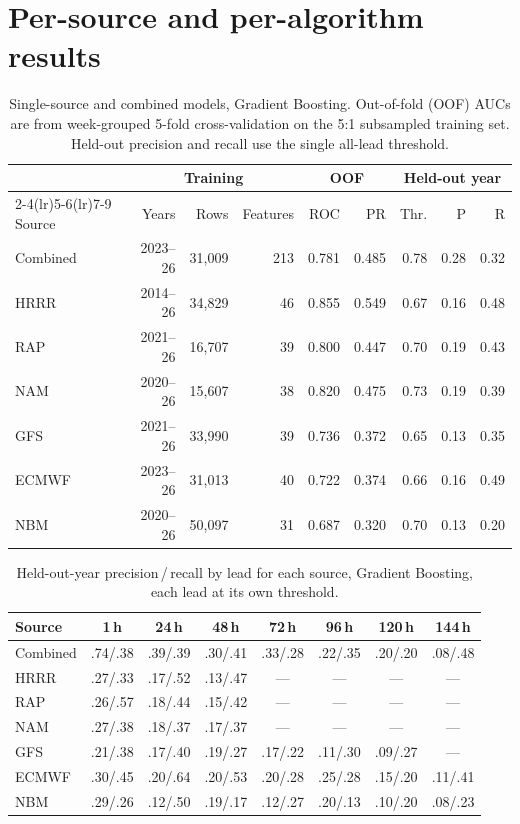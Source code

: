 \documentclass[11pt]{article}
\begin{document}
\section{Per-source and per-algorithm results}\label{app:sources}
\begin{table}[ht]\centering\small
\caption{Single-source and combined models, Gradient Boosting. Out-of-fold (OOF) AUCs are from
week-grouped 5-fold cross-validation on the 5:1 subsampled training set. Held-out precision and
recall use the single all-lead threshold.}\label{tab:persource}
\begin{tabular}{l r r r r r r r r}
\toprule
& \multicolumn{3}{c}{Training} & \multicolumn{2}{c}{OOF} & \multicolumn{3}{c}{Held-out year}\\
\cmidrule(lr){2-4}\cmidrule(lr){5-6}\cmidrule(lr){7-9}
Source & Years & Rows & Features & ROC & PR & Thr. & P & R\\
\midrule
Combined & 2023--26 & 31{,}009 & 213 & 0.781 & 0.485 & 0.78 & 0.28 & 0.32\\
HRRR  & 2014--26 & 34{,}829 & 46 & 0.855 & 0.549 & 0.67 & 0.16 & 0.48\\
RAP   & 2021--26 & 16{,}707 & 39 & 0.800 & 0.447 & 0.70 & 0.19 & 0.43\\
NAM   & 2020--26 & 15{,}607 & 38 & 0.820 & 0.475 & 0.73 & 0.19 & 0.39\\
GFS   & 2021--26 & 33{,}990 & 39 & 0.736 & 0.372 & 0.65 & 0.13 & 0.35\\
ECMWF & 2023--26 & 31{,}013 & 40 & 0.722 & 0.374 & 0.66 & 0.16 & 0.49\\
NBM   & 2020--26 & 50{,}097 & 31 & 0.687 & 0.320 & 0.70 & 0.13 & 0.20\\
\bottomrule
\end{tabular}
\end{table}

\begin{table}[ht]\centering\small
\caption{Held-out-year precision\,/\,recall by lead for each source, Gradient Boosting, each lead at
its own threshold.}\label{tab:prlead}
\begin{tabular}{l c c c c c c c}
\toprule
Source & 1\,h & 24\,h & 48\,h & 72\,h & 96\,h & 120\,h & 144\,h\\
\midrule
Combined & .74/.38 & .39/.39 & .30/.41 & .33/.28 & .22/.35 & .20/.20 & .08/.48\\
HRRR  & .27/.33 & .17/.52 & .13/.47 & --- & --- & --- & ---\\
RAP   & .26/.57 & .18/.44 & .15/.42 & --- & --- & --- & ---\\
NAM   & .27/.38 & .18/.37 & .17/.37 & --- & --- & --- & ---\\
GFS   & .21/.38 & .17/.40 & .19/.27 & .17/.22 & .11/.30 & .09/.27 & ---\\
ECMWF & .30/.45 & .20/.64 & .20/.53 & .20/.28 & .25/.28 & .15/.20 & .11/.41\\
NBM   & .29/.26 & .12/.50 & .19/.17 & .12/.27 & .20/.13 & .10/.20 & .08/.23\\
\bottomrule
\end{tabular}
\end{table}
\end{document}
